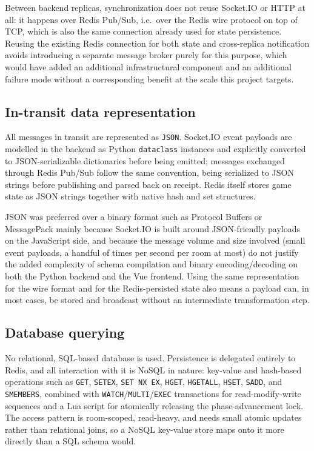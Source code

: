 \documentclass{scrartcl}
\begin{document}
Between backend replicas, synchronization does not reuse Socket.IO or HTTP at all: it happens over Redis Pub/Sub, i.e.\ over the Redis wire protocol on top of TCP, which is also the same connection already used for state persistence. Reusing the existing Redis connection for both state and cross-replica notification avoids introducing a separate message broker purely for this purpose, which would have added an additional infrastructural component and an additional failure mode without a corresponding benefit at the scale this project targets.

\subsection{In-transit data representation}

All messages in transit are represented as \texttt{JSON}. Socket.IO event payloads are modelled in the backend as Python \texttt{dataclass} instances and explicitly converted to JSON-serializable dictionaries before being emitted; messages exchanged through Redis Pub/Sub follow the same convention, being serialized to JSON strings before publishing and parsed back on receipt. Redis itself stores game state as JSON strings together with native hash and set structures.

JSON was preferred over a binary format such as Protocol Buffers or MessagePack mainly because Socket.IO is built around JSON-friendly payloads on the JavaScript side, and because the message volume and size involved (small event payloads, a handful of times per second per room at most) do not justify the added complexity of schema compilation and binary encoding/decoding on both the Python backend and the Vue frontend. Using the same representation for the wire format and for the Redis-persisted state also means a payload can, in most cases, be stored and broadcast without an intermediate transformation step.

\subsection{Database querying}

No relational, SQL-based database is used. Persistence is delegated entirely to Redis, and all interaction with it is NoSQL in nature: key-value and hash-based operations such as \texttt{GET}, \texttt{SETEX}, \texttt{SET NX EX}, \texttt{HGET}, \texttt{HGETALL}, \texttt{HSET}, \texttt{SADD}, and \texttt{SMEMBERS}, combined with \texttt{WATCH}/\texttt{MULTI}/\texttt{EXEC} transactions for read-modify-write sequences and a Lua script for atomically releasing the phase-advancement lock. The access pattern is room-scoped, read-heavy, and needs small atomic updates rather than relational joins, so a NoSQL key-value store maps onto it more directly than a SQL schema would.
\end{document}
